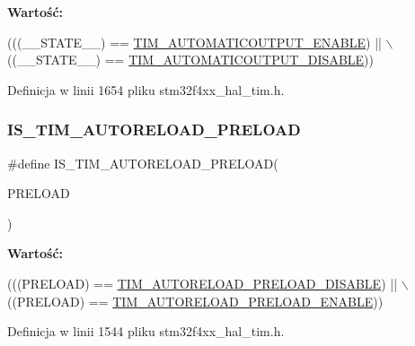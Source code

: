 {\bfseries Wartość\+:}
\begin{DoxyCode}
(((\_\_STATE\_\_) == \hyperlink{group___t_i_m___a_o_e___bit___set___reset_ga09e7f3f768b0f122f13fd47771f07ddf}{TIM\_AUTOMATICOUTPUT\_ENABLE}) || \(\backslash\)
                                                  ((\_\_STATE\_\_) == 
      \hyperlink{group___t_i_m___a_o_e___bit___set___reset_ga65b4336dee767fbe8d8cc4f980f6b18e}{TIM\_AUTOMATICOUTPUT\_DISABLE}))
\end{DoxyCode}


Definicja w linii 1654 pliku stm32f4xx\+\_\+hal\+\_\+tim.\+h.

\mbox{\label{group___t_i_m___private___macros_gab99bb1fa5b82450c33c693d19c2893e7}} 
\subsubsection{\texorpdfstring{I\+S\+\_\+\+T\+I\+M\+\_\+\+A\+U\+T\+O\+R\+E\+L\+O\+A\+D\+\_\+\+P\+R\+E\+L\+O\+AD}{IS\_TIM\_AUTORELOAD\_PRELOAD}}
{\footnotesize\ttfamily \#define I\+S\+\_\+\+T\+I\+M\+\_\+\+A\+U\+T\+O\+R\+E\+L\+O\+A\+D\+\_\+\+P\+R\+E\+L\+O\+AD(\begin{DoxyParamCaption}\item[{}]{P\+R\+E\+L\+O\+AD }\end{DoxyParamCaption})}

{\bfseries Wartość\+:}
\begin{DoxyCode}
(((PRELOAD) == \hyperlink{group___t_i_m___auto_reload_preload_ga4d0cf7e2800d0ab10f3f0ebfac11c9c7}{TIM\_AUTORELOAD\_PRELOAD\_DISABLE}) || \(\backslash\)
                                            ((PRELOAD) == 
      \hyperlink{group___t_i_m___auto_reload_preload_gaaa36f0c74b1d1ec83b0c105bfedfa309}{TIM\_AUTORELOAD\_PRELOAD\_ENABLE}))
\end{DoxyCode}


Definicja w linii 1544 pliku stm32f4xx\+\_\+hal\+\_\+tim.\+h.

\mbox{\label{group___t_i_m___private___macros_ga6eb4b934436eb7afd965214963abfb62}} 
